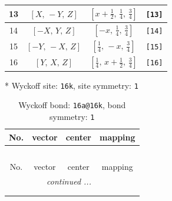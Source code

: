 \documentclass[fleqn,8pt]{jsarticle}
\begin{document}
\begin{longtable}{cccc}
13 & $\left[ X,\, - Y,\, Z \right]$ & $\left[ x + \frac{1}{2},\, \frac{1}{4},\, \frac{3}{4} \right]$ & {\tt [13]} \\ \hline
14 & $\left[ - X,\, Y,\, Z \right]$ & $\left[ - x,\, \frac{1}{4},\, \frac{3}{4} \right]$ & {\tt [14]} \\ \hline
15 & $\left[ - Y,\, - X,\, Z \right]$ & $\left[ \frac{1}{4},\, - x,\, \frac{3}{4} \right]$ & {\tt [15]} \\ \hline
16 & $\left[ Y,\, X,\, Z \right]$ & $\left[ \frac{1}{4},\, x + \frac{1}{2},\, \frac{3}{4} \right]$ & {\tt [16]} \\
\end{longtable}
* Wyckoff site: {\tt 16k}, site symmetry: {\tt 1}
\renewcommand{\arraystretch}{1.2}
\begin{longtable}{cccc}
\caption{Wyckoff bond: {\tt 16a@16k}, bond symmetry: {\tt 1}}
 \\
 \hline \hline
No. & vector & center & mapping \\ \hline \endfirsthead

\multicolumn{3}{l}{\tablename\ \thetable{}} \\
 \hline \hline
No. & vector & center & mapping \\ \hline \endhead

 \hline \hline
\multicolumn{3}{r}{\footnotesize\it continued ...} \\ \endfoot

 \hline \hline
\multicolumn{3}{r}{} \\ \endlastfoot


\end{longtable}
\end{document}
